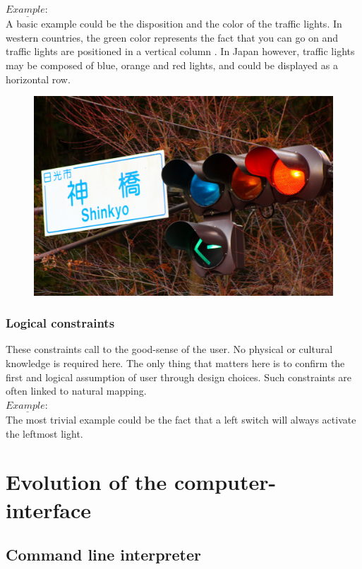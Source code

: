 \documentclass[a4paper,11pt] {article}
\theoremstyle{definition}
\begin{document}
        $\underline{Example:}$\\
        A basic example could be the disposition and the color of the traffic lights. In western countries, the green color represents the fact that you can go on and traffic lights are positioned in a vertical column . In Japan however, traffic lights may be composed of blue, orange and red lights, and could be displayed as a horizontal row.
        \begin{figure}[h]
        \centering
        \includegraphics[scale=0.1]{fig-report/japan-traffic-light.jpg}
        \end{figure}

        \subsubsection{Logical constraints}
        These constraints call to the good-sense of the user. No physical or cultural knowledge is required here. The only thing that matters here is to confirm the first and logical assumption of user through design choices. Such constraints are often linked to natural mapping.\\

        $\underline{Example:}$\\
        The most trivial example could be the fact that a left switch will always activate the leftmost light.

\section{Evolution of the computer-interface}
\label{sct:history}

    \subsection{Command line interpreter}
\end{document}
